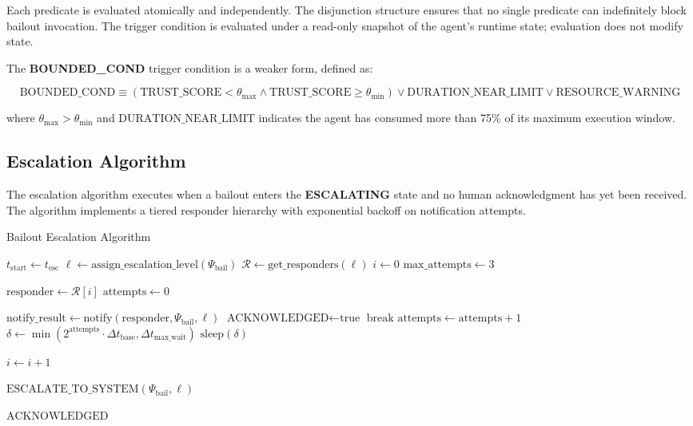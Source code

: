Each predicate is evaluated atomically and independently. The disjunction structure ensures that no single predicate can indefinitely block bailout invocation. The trigger condition is evaluated under a read-only snapshot of the agent's runtime state; evaluation does not modify state.

The \textbf{BOUNDED\_COND} trigger condition is a weaker form, defined as:

\begin{equation}
\text{BOUNDED\_COND} \equiv (\text{TRUST\_SCORE} < \theta_{\text{max}} \land \text{TRUST\_SCORE} \geq \theta_{\text{min}}) \lor \text{DURATION\_NEAR\_LIMIT} \lor \text{RESOURCE\_WARNING}
\end{equation}

where $\theta_{\text{max}} > \theta_{\text{min}}$ and $\text{DURATION\_NEAR\_LIMIT}$ indicates the agent has consumed more than 75\% of its maximum execution window.

\subsection{Escalation Algorithm}

The escalation algorithm executes when a bailout enters the \textbf{ESCALATING} state and no human acknowledgment has yet been received. The algorithm implements a tiered responder hierarchy with exponential backoff on notification attempts.

\begin{algorithm}
\caption{Bailout Escalation Algorithm}
\label{alg:escalation}
\begin{algorithmic}[1]
\State $t_{\text{start}} \gets t_{\text{esc}}$ 
\State $\ell \gets \text{assign\_escalation\_level}(\Psi_{\text{bail}})$ 
\State $\mathcal{R} \gets \text{get\_responders}(\ell)$ 
\State $i \gets 0$ 
\State $\text{max\_attempts} \gets 3$

  \State $\text{responder} \gets \mathcal{R}[i]$
  \State $\text{attempts} \gets 0$

    \State $\text{notify\_result} \gets \text{notify}(\text{responder}, \Psi_{\text{bail}}, \ell)$
      \State $\text{ACKNOWLEDGED} \gets \text{true}$
      \State $\text{break}$
    \EndIf
    \State $\text{attempts} \gets \text{attempts} + 1$
    \State $\delta \gets \min(2^{\text{attempts}} \cdot \Delta t_{\text{base}}, \Delta t_{\text{max\_wait}})$
    \State $\text{sleep}(\delta)$
  \EndWhile

    \State $i \gets i + 1$ 
  \EndIf
\EndWhile

  \State $\text{ESCALATE\_TO\_SYSTEM}(\Psi_{\text{bail}}, \ell)$ 
\EndIf

\State \Return $\text{ACKNOWLEDGED}$
\end{algorithmic}
\end{algorithm}

